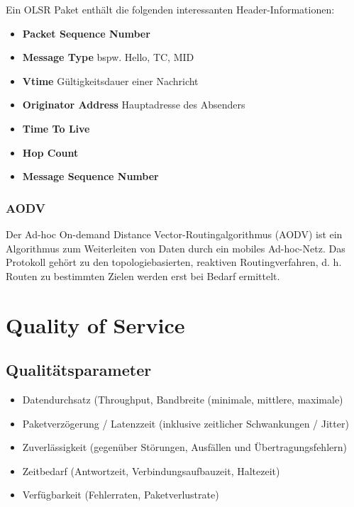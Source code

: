 \documentclass{article} %
\begin{document}
\noindent Ein OLSR Paket enthält die folgenden interessanten Header-Informationen:
	\begin{itemize}
	\item \textbf{Packet Sequence Number}
	\item \textbf{Message Type} bspw. Hello, TC, MID
	\item \textbf{Vtime} Gültigkeitsdauer einer Nachricht
	\item \textbf{Originator Address} Hauptadresse des Absenders
	\item \textbf{Time To Live}
	\item \textbf{Hop Count}
	\item \textbf{Message Sequence Number}
	\end{itemize}
	
\subsubsection{AODV}
Der Ad-hoc On-demand Distance Vector-Routingalgorithmus (AODV) ist ein Algorithmus zum Weiterleiten von Daten durch ein mobiles Ad-hoc-Netz. Das Protokoll gehört zu den topologiebasierten, reaktiven Routingverfahren, d. h. Routen zu bestimmten Zielen werden erst bei Bedarf ermittelt.
\section{Quality of Service}
\label{sec:qos}
\subsection{Qualitätsparameter}
	\begin{itemize}
	\item Datendurchsatz (Throughput, Bandbreite (minimale, mittlere, maximale)
	\item Paketverzögerung / Latenzzeit (inklusive zeitlicher Schwankungen / Jitter)
	\item Zuverlässigkeit (gegenüber Störungen,  Ausfällen und Übertragungsfehlern)
	\item Zeitbedarf (Antwortzeit,  Verbindungsaufbauzeit,  Haltezeit)
	\item Verfügbarkeit (Fehlerraten,  Paketverlustrate)
	\end{itemize}
	
\end{document}
